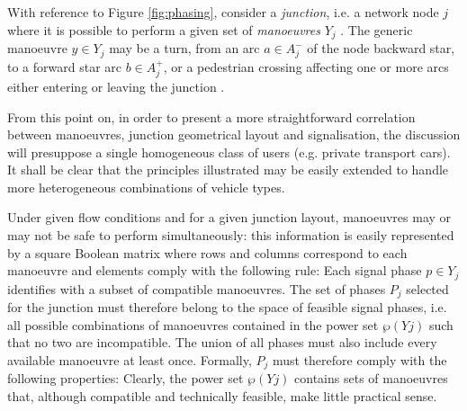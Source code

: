With reference to Figure \ref{fig:phasing}, consider a \emph{junction}, i.e. a network node $j$ where it is possible to perform a given set of \emph{manoeuvres} $Y_j$ .
 The generic manoeuvre  $y \in Y_j$ may be a turn, from an arc $a \in A^{-}_{j}$ of the node backward star, to a forward star arc $b \in A^{+}_{j}$, or a pedestrian crossing affecting one or more arcs either entering or leaving the junction  .

From this point on, in order to present a more straightforward correlation between manoeuvres, junction geometrical layout and signalisation, the discussion will presuppose a single homogeneous class of users (e.g. private transport cars).
It shall be clear that the principles illustrated may be easily extended to handle more heterogeneous combinations of vehicle types.

Under given flow conditions and for a given junction layout, manoeuvres may or may not be safe to perform simultaneously: this information is easily represented by a square Boolean matrix where rows and columns correspond to each manoeuvre and elements comply with the following rule:
Each signal phase $p \in Y_j$ identifies with a subset of compatible manoeuvres. The set of phases $P_j$ selected for the junction must therefore belong to the space of feasible signal phases, i.e. all possible combinations of manoeuvres contained in the power set $\wp(Yj)$ such that no two are incompatible. The union of all phases must also include every available manoeuvre at least once. Formally, $P_j$ must therefore comply with the following properties:
Clearly, the power set $\wp(Yj)$ contains sets of manoeuvres that, although compatible and  technically feasible, make little practical sense.

